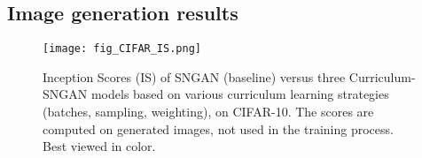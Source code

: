\documentclass[10pt,twocolumn,letterpaper]{article}
\begin{document}
\vspace{-0.1cm}
\subsection{Image generation results}
\vspace{-0.1cm}

\begin{figure}[!t]
\begin{center}
\texttt{[image: fig\_CIFAR\_IS.png]}
\end{center}
\vspace*{-0.3cm}
\caption{Inception Scores (IS) of SNGAN (baseline) versus three Curriculum-SNGAN models based on various curriculum learning strategies (batches, sampling, weighting), on CIFAR-10. The scores are computed on generated images, not used in the training process. Best viewed in color.}
\label{fig_CIFAR_IS}
\end{figure}
\end{document}
